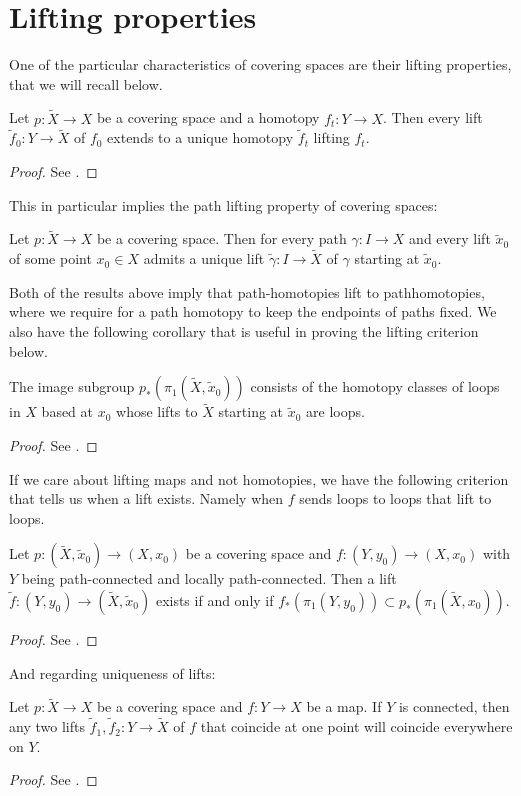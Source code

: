 \documentclass{report}
\begin{document}
\section{Lifting properties}
One of the particular characteristics of covering spaces are their lifting properties, that we will recall below.
\begin{proposition}
    Let $p: \tilde X \to X$ be a covering space and a homotopy $f_t: Y \to X$.
    Then every lift $\tilde f_0:Y \to \tilde X$ of $f_0$ extends to a unique homotopy $\tilde f_t$ lifting $f_t$.
\end{proposition}
\begin{proof}
    See \cite[Proposition 1.30]{hatcher2002topology}.
\end{proof}
This in particular implies the path lifting property of covering spaces:
\begin{corollary}
    Let $p: \tilde X \to X$ be a covering space.
    Then for every path $\gamma: I \to X$ and every lift $\tilde x_0$ of some point $x_0 \in X$ admits a unique lift $\tilde \gamma: I \to \tilde X$ of $\gamma$ starting at $\tilde x_0$.
\end{corollary}
Both of the results above imply that path-homotopies lift to pathhomotopies, where we require for a path homotopy to keep the endpoints of paths fixed.
We also have the following corollary that is useful in proving the lifting criterion below.
\begin{corollary}
    The image subgroup $p_*(\pi_1(\tilde X,\tilde x_0))$ consists of the homotopy classes of loops in $X$ based at $x_0$ whose lifts to $\tilde X$ starting at $\tilde x_0$ are loops.
\end{corollary}
\begin{proof}
    See \cite[Corollary 1.31]{hatcher2002topology}.
\end{proof}
If we care about lifting maps and not homotopies, we have the following criterion that tells us when a lift exists.
Namely when $f$ sends loops to loops that lift to loops.
\begin{proposition}
    Let $p: (\tilde X, \tilde x_0) \to (X,x_0)$ be a covering space and $f: (Y,y_0) \to (X,x_0)$ with $Y$ being path-connected and locally path-connected.
    Then a lift $\tilde f: (Y, y_0) \to (\tilde X, \tilde x_0)$ exists if and only if $f_*(\pi_1(Y,y_0)) \subset p_*(\pi_1(\tilde X,x_0))$.
\end{proposition}
\begin{proof}
    See \cite[Proposition 1.33]{hatcher2002topology}.
\end{proof}
And regarding uniqueness of lifts:
\begin{proposition}
    Let $p: \tilde X \to X$ be a covering space and $f: Y \to X$ be a map.
    If $Y$ is connected, then any two lifts $\tilde f_1, \tilde f_2: Y \to \tilde X$ of $f$ that coincide at one point will coincide everywhere on $Y$.  
\end{proposition}
\begin{proof}
    See \cite[Proposition 1.34]{hatcher2002topology}.
\end{proof}
\end{document}
